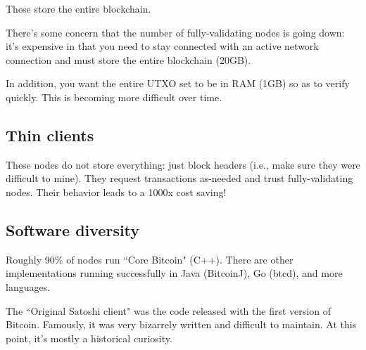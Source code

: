 \documentclass[12pt]{article}
\begin{document}
These store the entire blockchain.

There's some concern that the number of fully-validating nodes is going down: it's expensive in that you need to stay connected with an active network connection and must store the entire blockchain (20GB).

In addition, you want the entire UTXO set to be in RAM (1GB) so as to verify quickly. This is becoming more difficult over time.

\subsection*{Thin clients}

These nodes do not store everything: just block headers (i.e., make sure they were difficult to mine). They request transactions as-needed and trust fully-validating nodes. Their behavior leads to a 1000x cost saving!

\subsection*{Software diversity}

Roughly 90\% of nodes run ``Core Bitcoin" (C++). There are other implementations running successfully in Java (BitcoinJ), Go (btcd), and more languages.

The ``Original Satoshi client" was the code released with the first version of Bitcoin. Famously, it was very bizarrely written and difficult to maintain. At this point, it's mostly a historical curiosity.
\end{document}
